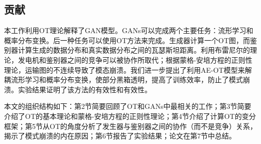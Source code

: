 \subsection{贡献}

本工作利用OT理论解释了GAN模型。GANs可以完成两个主要任务：流形学习和概率分布变换。后一种任务可以使用OT方法来完成。生成器计算一个OT图，而鉴别器计算生成的数据分布和真实数据分布之间的瓦瑟斯坦距离。利用布雷尼尔的理论，发电机和鉴别器之间的竞争可以被协作所取代；根据蒙格-安培方程的正则性理论，运输图的不连续导致了模态崩溃。我们进一步提出了利用AE-OT模型来解耦流形学习和概率分布变换，使部分黑箱透明，提高了训练效率，防止了模式崩溃。实验结果证明了该方法的有效性和有效性。

本文的组织结构如下：第2节简要回顾了OT和GANs中最相关的工作；第3节简要介绍了OT的基本理论和蒙格-安培方程的正则性理论；第4节介绍了计算OT的变分框架；第5节从OT的角度分析了发生器与鉴别器之间的协作（而不是竞争）关系，揭示了模式崩溃的内在原因；第6节报告了实验结果；论文在第7节中总结。